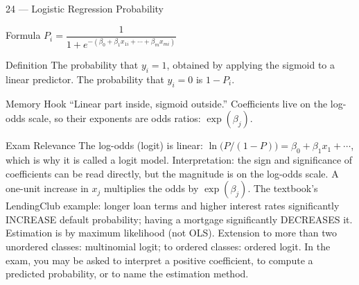 \documentclass[aspectratio=169,8pt]{beamer}
\begin{document}
	\begin{frame}{24 --- Logistic Regression Probability}
		\begin{block}{Formula}
			$P_i = \dfrac{1}{1 + e^{-(\beta_0 + \beta_1 x_{1i} + \cdots + \beta_m x_{mi})}}$
		\end{block}
		\begin{block}{Definition}
			The probability that $y_i = 1$, obtained by applying the sigmoid to a linear predictor. The probability that $y_i = 0$ is $1 - P_i$.
		\end{block}
		\begin{block}{Memory Hook}
			``Linear part inside, sigmoid outside.'' Coefficients live on the log-odds scale, so their exponents are odds ratios: $\exp(\beta_j)$.
		\end{block}
		\begin{block}{Exam Relevance}
			The log-odds (logit) is linear: $\ln\!\big(P/(1-P)\big) = \beta_0 + \beta_1 x_1 + \cdots$, which is why it is called a logit model. Interpretation: the sign and significance of coefficients can be read directly, but the magnitude is on the log-odds scale. A one-unit increase in $x_j$ multiplies the odds by $\exp(\beta_j)$. The textbook's LendingClub example: longer loan terms and higher interest rates significantly INCREASE default probability; having a mortgage significantly DECREASES it. Estimation is by maximum likelihood (not OLS). Extension to more than two unordered classes: multinomial logit; to ordered classes: ordered logit. In the exam, you may be asked to interpret a positive coefficient, to compute a predicted probability, or to name the estimation method.
		\end{block}
	\end{frame}
	
\end{document}
